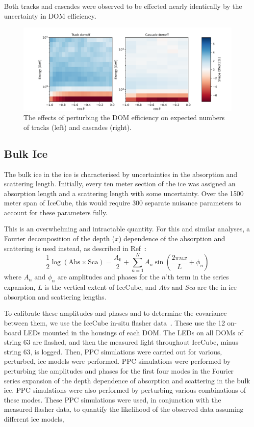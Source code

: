 \documentclass[main.tex]{subfiles}
\begin{document}
Both tracks and cascades were observed to be effected nearly identically by the uncertainty in DOM efficiency. 

\begin{figure}
    \centering
    \includegraphics[width=0.8\linewidth]{figures/systematics/domeff.png}
    \caption{The effects of perturbing the DOM efficiency on expected numbers of tracks (left) and cascades (right).}\label{fig:domeff_analysis}
\end{figure}

\subsection{Bulk Ice}\label{sec:bulk}

The bulk ice in the ice is characterised by uncertainties in the absorption and scattering length. 
Initially, every ten meter section of the ice was assigned an absorption length and a scattering length with some uncertainty. 
Over the 1500 meter span of IceCube, this would require 300 separate nuisance parameters to account for these parameters fully.

This is an overwhelming and intractable quantity. 
For this and similar analyses, a Fourier decomposition of the depth ($x$) dependence of the absorption and scattering is used instead, as described in Ref~\cite{Aartsen_2019_snow}: 
\begin{equation}
    \dfrac{1}{2}\log\left(\text{Abs} \times \text{Sca}\right) = \dfrac{A_{0}}{2} +\sum\limits_{n=1}^{N}A_{n} \sin\left(\dfrac{2\pi nx}{L} + \phi_{n}\right)
\end{equation}
where $A_{n}$ and $\phi_{n}$ are amplitudes and phases for the $n$'th term in the series expansion, $L$ is the vertical extent of IceCube, and \textit{Abs} and \textit{Sca} are the in-ice absorption and scattering lengths. 


To calibrate these amplitudes and phases and to determine the covariance between them, we use the IceCube in-situ flasher data~\cite{Aartsen_2013}. 
These use the 12 on-board LEDs mounted in the housings of each DOM. 
The LEDs on all DOMs of string 63 are flashed, and then the measured light throughout IceCube, minus string 63, is logged. 
Then, PPC simulations were carried out for various, perturbed, ice models were performed. 
PPC simulations were performed by perturbing the amplitudes and phases for the first four modes in the Fourier series expansion of the depth dependence of absorption and scattering in the bulk ice.
PPC simulations were also performed by perturbing various combinations of these modes. 
These PPC simulations were used, in conjunction with the measured flasher data, to quantify the likelihood of the observed data assuming different ice models,
\end{document}
